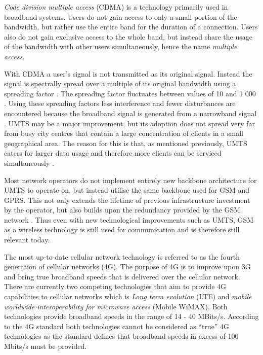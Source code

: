 \emph{Code division multiple access} (CDMA) is a technology primarily used in broadband systems. Users do not gain access to only a small portion of the bandwidth, but rather use the entire band for the duration of a connection\cite{GSMArchitectureProtocolsServices}. Users also do not gain exclusive access to the whole band, but instead share the usage of the bandwidth with other users simultaneously, hence the name \emph{multiple access}\cite{GSMArchitectureProtocolsServices}.

With CDMA a user's signal is not transmitted as its original signal. Instead the signal is spectrally spread over a multiple of its original bandwidth using a spreading factor \cite{GSMArchitectureProtocolsServices}. The spreading factor fluctuates between values of 10 and 1 000 \cite{GSMArchitectureProtocolsServices}. Using these spreading factors less interference and fewer disturbances are encountered because the broadband signal is generated from a narrowband signal \cite{GSMArchitectureProtocolsServices}.
UMTS may be a major improvement, but its adoption does not spread very far from busy city centres that contain a large concentration of clients in a small geographical area\cite{GSMArchitectureProtocolsServices}. The reason for this is that, as mentioned previously, UMTS caters for larger data usage and therefore more clients can be serviced simultaneously \cite{GSMArchitectureProtocolsServices}.

Most network operators do not implement entirely new backbone architecture for UMTS\label{UMTSGSMBackbone} to operate on, but instead utilise the same backbone used for GSM and GPRS\@. This not only extends the lifetime of previous infrastructure investment by the operator, but also builds upon the redundancy provided by the GSM network \cite{GSMArchitectureProtocolsServices}. Thus even with new technological improvements such as UMTS, GSM as a wireless technology is still used for communication and is therefore still relevant today.


The most up-to-date cellular network technology is referred to as the fourth generation of cellular networks (4G)\cite{4GWirelessVid}. The purpose of 4G is to improve upon 3G and bring true broadband speeds that is delivered over the cellular network\cite{4GWirelessVid}. There are currently two competing technologies that aim to provide 4G capabilities to cellular networks which is \emph{Long term evolution} (LTE) and \emph{mobile worldwide interoperability for microwave access} (Mobile WiMAX)\cite{4GWirelessVid}. Both technologies provide broadband speeds in the range of 14 - 40 MBits/s\cite{4GWirelessVid}. According to the 4G standard both technologies cannot be considered as ``true'' 4G technologies as the standard defines that broadband speeds in excess of 100 Mbits/s must be provided\cite{4GWirelessVid}.

